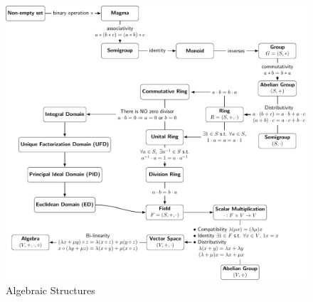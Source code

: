 \documentclass[11pt,openany]{article}
\begin{document}
\begin{figure}[h!]\centering
\includegraphics[width=\textwidth]{../tikz/grad-math-tikz-algebra/algebraic_structure.pdf}
\caption{Algebraic Structures}
\end{figure}
\end{document}
